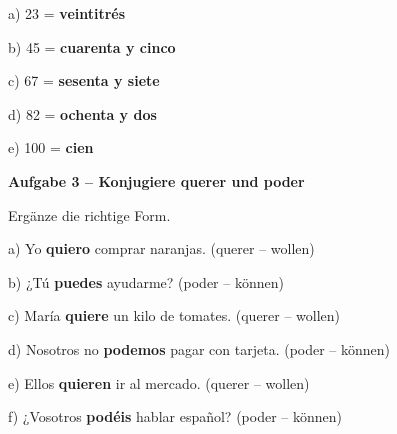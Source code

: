 \documentclass[11pt, a4paper]{article}
\newcommand{\fachfarbe}{spanisch}
\newcommand{\punktebox}[1]{\hfill\fbox{\small \_/#1}}
\newcommand{\lsg}[1]{\textcolor{loesung}{\textbf{#1}}}
\newenvironment{aufgabe}[1]{%
    \needspace{5\baselineskip}%
    \nopagebreak[4]%
    \vspace{10pt}
    \noindent\textbf{\textcolor{\fachfarbe}{Aufgabe #1}}
    \nopagebreak[4]%
    \vspace{5pt}
    \nopagebreak[4]%
    \begin{list}{}{\leftmargin=0pt}
    \item[]
}{%
    \end{list}
}
\newcommand{\es}[1]{\textcolor{\fachfarbe}{\textbf{#1}}}
\begin{document}
\noindent
a) 23 = \lsg{veintitrés}

\vspace{0.8em}

\noindent
b) 45 = \lsg{cuarenta y cinco}

\vspace{0.8em}

\noindent
c) 67 = \lsg{sesenta y siete}

\vspace{0.8em}

\noindent
d) 82 = \lsg{ochenta y dos}

\vspace{0.8em}

\noindent
e) 100 = \lsg{cien}

\vspace{15pt}


\begin{aufgabe}{3 -- Konjugiere \es{querer} und \es{poder}}
Ergänze die richtige Form. \punktebox{6}
\end{aufgabe}

\noindent
a) Yo \lsg{quiero} comprar naranjas. \hfill (querer -- wollen)

\vspace{0.8em}

\noindent
b) ¿Tú \lsg{puedes} ayudarme? \hfill (poder -- können)

\vspace{0.8em}

\noindent
c) María \lsg{quiere} un kilo de tomates. \hfill (querer -- wollen)

\vspace{0.8em}

\noindent
d) Nosotros no \lsg{podemos} pagar con tarjeta. \hfill (poder -- können)

\vspace{0.8em}

\noindent
e) Ellos \lsg{quieren} ir al mercado. \hfill (querer -- wollen)

\vspace{0.8em}

\noindent
f) ¿Vosotros \lsg{podéis} hablar español? \hfill (poder -- können)

\vspace{15pt}

\end{document}
